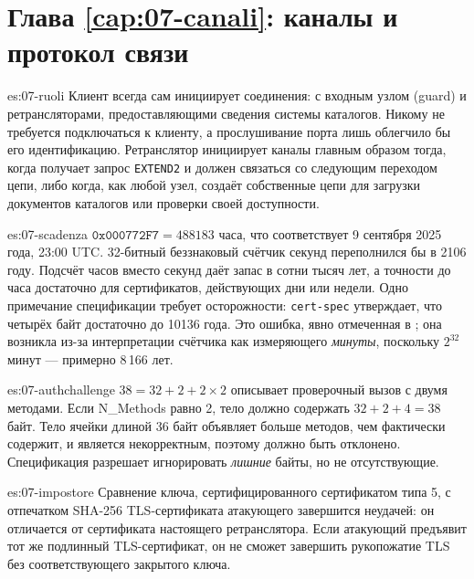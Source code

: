 \section*{Глава \ref{cap:07-canali}: каналы и протокол связи}

\begin{soluzione}{es:07-ruoli}
Клиент всегда сам инициирует соединения: с входным узлом (guard) и ретрансляторами, предоставляющими сведения системы каталогов. Никому не требуется подключаться к клиенту, а прослушивание порта лишь облегчило бы его идентификацию. Ретранслятор инициирует каналы главным образом тогда, когда получает запрос \texttt{EXTEND2} и должен связаться со следующим переходом цепи, либо когда, как любой узел, создаёт собственные цепи для загрузки документов каталогов или проверки своей доступности.
\end{soluzione}

\begin{soluzione}{es:07-scadenza}
$\texttt{0x000772F7} = 488183$ часа, что соответствует 9 сентября 2025 года, 23:00 UTC. 32-битный беззнаковый счётчик секунд переполнился бы в 2106 году. Подсчёт часов вместо секунд даёт запас в сотни тысяч лет, а точности до часа достаточно для сертификатов, действующих дни или недели. Одно примечание спецификации требует осторожности: \texttt{cert-spec} утверждает, что четырёх байт достаточно до 10136 года. Это ошибка, явно отмеченная в ; она возникла из-за интерпретации счётчика как измеряющего \emph{минуты}, поскольку $2^{32}$ минут — примерно 8\,166 лет.
\end{soluzione}

\begin{soluzione}{es:07-authchallenge}
$38 = 32 + 2 + 2 \times 2$ описывает проверочный вызов с двумя методами. Если N\_Methods равно 2, тело должно содержать $32 + 2 + 4 = 38$ байт. Тело ячейки длиной 36 байт объявляет больше методов, чем фактически содержит, и является некорректным, поэтому должно быть отклонено. Спецификация разрешает игнорировать \emph{лишние} байты, но не отсутствующие.
\end{soluzione}

\begin{soluzione}{es:07-impostore}
Сравнение ключа, сертифицированного сертификатом типа 5, с отпечатком SHA-256 TLS-сертификата атакующего завершится неудачей: он отличается от сертификата настоящего ретранслятора. Если атакующий предъявит тот же подлинный TLS-сертификат, он не сможет завершить рукопожатие TLS без соответствующего закрытого ключа.
\end{soluzione}

